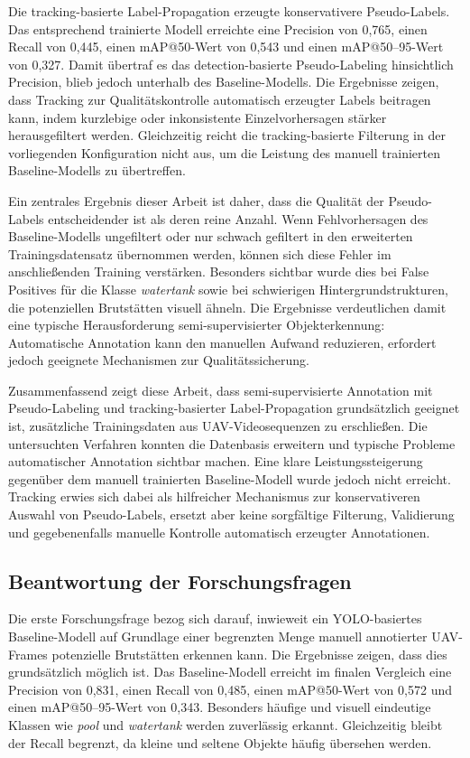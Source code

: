 Die tracking-basierte Label-Propagation erzeugte konservativere Pseudo-Labels.
Das entsprechend trainierte Modell erreichte eine Precision von 0{,}765, einen
Recall von 0{,}445, einen mAP@50-Wert von 0{,}543 und einen mAP@50--95-Wert
von 0{,}327. Damit übertraf es das detection-basierte Pseudo-Labeling hinsichtlich
Precision, blieb jedoch unterhalb des Baseline-Modells. Die Ergebnisse zeigen,
dass Tracking zur Qualitätskontrolle automatisch erzeugter Labels beitragen kann,
indem kurzlebige oder inkonsistente Einzelvorhersagen stärker herausgefiltert
werden. Gleichzeitig reicht die tracking-basierte Filterung in der vorliegenden
Konfiguration nicht aus, um die Leistung des manuell trainierten Baseline-Modells
zu übertreffen.

Ein zentrales Ergebnis dieser Arbeit ist daher, dass die Qualität der Pseudo-Labels
entscheidender ist als deren reine Anzahl. Wenn Fehlvorhersagen des
Baseline-Modells ungefiltert oder nur schwach gefiltert in den erweiterten
Trainingsdatensatz übernommen werden, können sich diese Fehler im
anschließenden Training verstärken. Besonders sichtbar wurde dies bei False
Positives für die Klasse \textit{watertank} sowie bei schwierigen
Hintergrundstrukturen, die potenziellen Brutstätten visuell ähneln. Die Ergebnisse
verdeutlichen damit eine typische Herausforderung semi-supervisierter
Objekterkennung: Automatische Annotation kann den manuellen Aufwand
reduzieren, erfordert jedoch geeignete Mechanismen zur Qualitätssicherung.

Zusammenfassend zeigt diese Arbeit, dass semi-supervisierte Annotation mit
Pseudo-Labeling und tracking-basierter Label-Propagation grundsätzlich geeignet
ist, zusätzliche Trainingsdaten aus UAV-Videosequenzen zu erschließen. Die
untersuchten Verfahren konnten die Datenbasis erweitern und typische Probleme
automatischer Annotation sichtbar machen. Eine klare Leistungssteigerung
gegenüber dem manuell trainierten Baseline-Modell wurde jedoch nicht erreicht.
Tracking erwies sich dabei als hilfreicher Mechanismus zur konservativeren
Auswahl von Pseudo-Labels, ersetzt aber keine sorgfältige Filterung, Validierung
und gegebenenfalls manuelle Kontrolle automatisch erzeugter Annotationen.

\subsection{Beantwortung der Forschungsfragen}

Die erste Forschungsfrage bezog sich darauf, inwieweit ein YOLO-basiertes
Baseline-Modell auf Grundlage einer begrenzten Menge manuell annotierter
UAV-Frames potenzielle Brutstätten erkennen kann. Die Ergebnisse zeigen, dass
dies grundsätzlich möglich ist. Das Baseline-Modell erreicht im finalen Vergleich
eine Precision von 0{,}831, einen Recall von 0{,}485, einen mAP@50-Wert von
0{,}572 und einen mAP@50--95-Wert von 0{,}343. Besonders häufige und visuell
eindeutige Klassen wie \textit{pool} und \textit{watertank} werden zuverlässig
erkannt. Gleichzeitig bleibt der Recall begrenzt, da kleine und seltene Objekte
häufig übersehen werden.

